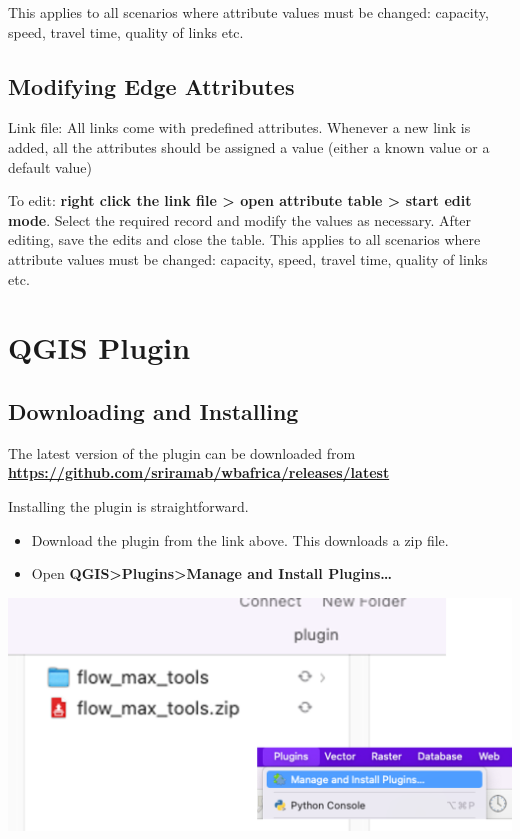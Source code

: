 \documentclass[
]{book}
\providecommand{\tightlist}{%
  \setlength{\itemsep}{0pt}\setlength{\parskip}{0pt}}
\begin{document}
This applies to all scenarios where attribute values must be changed: capacity, speed, travel time, quality of links etc.

\chapter{Modifying Edge Attributes}\label{modifying-edge-attributes}

Link file: All links come with predefined attributes. Whenever a new link is added, all the attributes should be assigned a value (either a known value or a default value)

To edit: \textbf{right click the link file \textgreater{} open attribute table \textgreater{} start edit mode}. Select the required record and modify the values as necessary. After editing, save the edits and close the table. This applies to all scenarios where attribute values must be changed: capacity, speed, travel time, quality of links etc.

\part{QGIS Plugin}\label{part-qgis-plugin}

\chapter{Downloading and Installing}\label{downloading-and-installing}

The latest version of the plugin can be downloaded from \textbf{\url{https://github.com/sriramab/wbafrica/releases/latest}}

Installing the plugin is straightforward.

\begin{itemize}
\tightlist
\item
  Download the plugin from the link above. This downloads a zip file.
\item
  Open \textbf{QGIS\textgreater Plugins\textgreater Manage and Install Plugins\ldots{}}
\end{itemize}

\includegraphics{./images/afterDownload.png}
\end{document}
